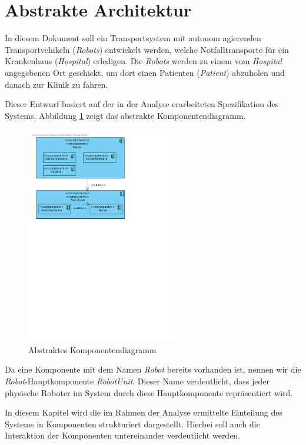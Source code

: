 \section{Abstrakte Architektur}
In diesem Dokument soll ein Transportsystem mit autonom agierenden Transportvehikeln (\emph{Robots})
entwickelt werden, welche Notfalltransporte für ein Krankenhaus (\emph{Hospital}) erledigen. Die \emph{Robots} werden zu
einem vom \emph{Hospital} angegebenen Ort geschickt, um dort einen Patienten (\emph{Patient}) abzuholen und
danach zur Klinik zu fahren.

Dieser Entwurf basiert auf der in der Analyse erarbeiteten Spezifikation des Systems. Abbildung \ref{KomponentendiagrammAbstrakt} zeigt das abstrakte Komponentendiagramm.

\begin{figure}[H]
	\centering
	\includegraphics[width=0.6\textwidth]{img/AbstrakteArchitektur}
	\caption{Abstraktes Komponentendiagramm}
	\label{KomponentendiagrammAbstrakt}
\end{figure}

Da eine Komponente mit dem Namen \emph{Robot} bereits vorhanden ist, nennen wir die \emph{Robot}-Hauptkomponente \emph{RobotUnit}. Dieser Name verdeutlicht, dass jeder physische Roboter im System durch diese Hauptkomponente repr\"{a}sentiert wird.


In diesem Kapitel wird die im Rahmen der Analyse ermittelte Einteilung des Systems in Komponenten strukturiert dargestellt. Hierbei soll auch die Interaktion der Komponenten untereinander verdeutlicht werden.

